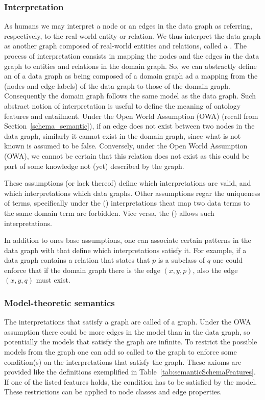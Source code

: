 \subsubsection{Interpretation}
As humans we may interpret a node or an edges in the data graph as referring, respectively, to the real-world entity or relation. We thus interpret the data graph as another graph composed of real-world entities and relations, called a . The process of interpretation consists in mapping the nodes and the edges in the data graph to entities and relations in the domain graph. So, we can abstractly define an  of a data graph as being composed of a domain graph ad a mapping from the  (nodes and edge labels) of the data graph to those of the domain graph. Consequently the domain graph follows the same model as the data graph. Such abstract notion of interpretation is useful to define the meaning of ontology features and entailment. Under the Open World Assumption (OWA) (recall from Section~\ref{schema_semantic}), if an edge does not exist between two nodes in the data graph, similarly it cannot exist in the domain graph, since what is not known is assumed to be false.  Conversely, under the Open World Assumption (OWA), we cannot be certain that this relation does not exist as this could be part of some knowledge not (yet) described by the graph. 

These assumptions (or lack thereof) define which interpretations are valid, and which interpretations which data graphs. Other assumptions regar the uniqueness of terms, specifically under the  () interpretations theat map two data terms to the same domain term are forbidden. Vice versa, the  () allows such interpretations. 

In addition to ones base assumptions, one can associate certain patterns in the data graph with  that define which interpretations satisfy it. For example, if a data graph contains a relation that states that $p$ is a subclass of $q$ one could enforce that if the domain graph there is the edge $(x,y,p)$, also the edge $(x,y,q)$ must exist.

\subsubsection{Model-theoretic semantics}
The interpretations that satisfy a graph are called  of a graph. Under the OWA assumption there could be more edges in the model than in the data graph, so potentially the models that satisfy the graph are infinite. To restrict the possible models from the graph one can add so called  to the graph to enforce some condition(s) on the interpretations that satisfy the graph. These axioms are provided like the definitions exemplified in Table~\ref{tab:semanticSchemaFeatures}. If one of the listed features holds, the condition has to be satisfied by the model. These restrictions can be applied to node classes and edge properties.


